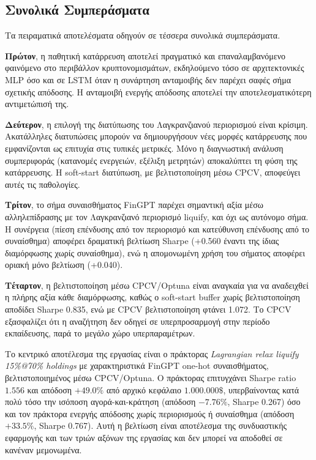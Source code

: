 \subsection{Συνολικά Συμπεράσματα}
\label{subsec:exp-final-conclusions}

Τα πειραματικά αποτελέσματα οδηγούν σε τέσσερα συνολικά συμπεράσματα.

\textbf{Πρώτον}, η παθητική κατάρρευση αποτελεί πραγματικό και επαναλαμβανόμενο φαινόμενο στο περιβάλλον κρυπτονομισμάτων, εκδηλούμενο τόσο σε αρχιτεκτονικές MLP όσο και σε LSTM όταν η συνάρτηση ανταμοιβής δεν παρέχει σαφές σήμα σχετικής απόδοσης. Η ανταμοιβή ενεργής απόδοσης αποτελεί την αποτελεσματικότερη αντιμετώπισή της.

\textbf{Δεύτερον}, η επιλογή της διατύπωσης του Λαγκρανζιανού περιορισμού είναι κρίσιμη. Ακατάλληλες διατυπώσεις μπορούν να δημιουργήσουν νέες μορφές κατάρρευσης που εμφανίζονται ως επιτυχία στις τυπικές μετρικές. Μόνο η διαγνωστική ανάλυση συμπεριφοράς (κατανομές ενεργειών, εξέλιξη μετρητών) αποκαλύπτει τη φύση της κατάρρευσης. Η soft-start διατύπωση, με βελτιστοποίηση μέσω CPCV, αποφεύγει αυτές τις παθολογίες.

\textbf{Τρίτον}, το σήμα συναισθήματος FinGPT παρέχει σημαντική αξία μέσω αλληλεπίδρασης με τον Λαγκρανζιανό περιορισμό liquify, και όχι ως αυτόνομο σήμα. Η συνέργεια (πίεση επένδυσης από τον περιορισμό και κατεύθυνση επένδυσης από το συναίσθημα) αποφέρει δραματική βελτίωση Sharpe (+0.560 έναντι της ίδιας διαμόρφωσης χωρίς συναίσθημα), ενώ η απομονωμένη χρήση του σήματος αποφέρει οριακή μόνο βελτίωση (+0.040).

\textbf{Τέταρτον}, η βελτιστοποίηση μέσω CPCV/Optuna είναι αναγκαία για να αναδειχθεί η πλήρης αξία κάθε διαμόρφωσης, καθώς ο soft-start buffer χωρίς βελτιστοποίηση αποδίδει Sharpe 0.835, ενώ με CPCV βελτιστοποίηση φτάνει 1.072. Το CPCV εξασφαλίζει ότι η αναζήτηση δεν οδηγεί σε υπερπροσαρμογή στην περίοδο εκπαίδευσης, παρά το μεγάλο χώρο υπερπαραμέτρων.

Το κεντρικό αποτέλεσμα της εργασίας είναι ο πράκτορας \textit{Lagrangian relax liquify 15\%@70\% holdings} με χαρακτηριστικά FinGPT one-hot συναισθήματος, βελτιστοποιημένος μέσω CPCV/Optuna. Ο πράκτορας επιτυγχάνει Sharpe ratio $1{.}556$ και απόδοση $+49{.}0\%$ από αρχικό κεφάλαιο $1.000.000\$$, υπερβαίνοντας κατά πολύ τόσο την ισόποση αγορά-και-κράτηση (απόδοση $-7{.}76\%$, Sharpe 0.267) όσο και τον πράκτορα ενεργής απόδοσης χωρίς περιορισμούς ή συναίσθημα (απόδοση $+33{.}5\%$, Sharpe 0.767). Αυτή η βελτίωση είναι αποτέλεσμα της συνδυαστικής εφαρμογής και των τριών αξόνων της εργασίας και δεν μπορεί να αποδοθεί σε κανέναν μεμονωμένα.
